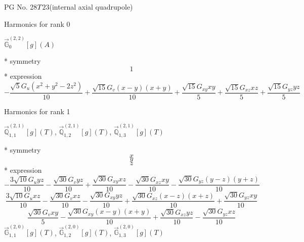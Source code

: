 \documentclass[fleqn,8pt]{jsarticle}
\begin{document}
\setcounter{MaxMatrixCols}{32}

\renewcommand{\tablename}{Table~}
\renewcommand{\figurename}{Figure~}
\begin{center}
\LARGE
PG No. 28\quad$T_{\rm }$\quad$23$\quad[ cubic ] (internal axial quadrupole)
\end{center}

\noindent * Harmonics for rank 0

\noindent\quad $\vec{\mathbb{G}}_{0}^{(2,2)}[g](A)$

\noindent\quad ** symmetry
\begin{dmath*}
1
\end{dmath*}
\noindent\quad ** expression
\begin{dmath*}
- \frac{\sqrt{5} G_{u} \left(x^{2} + y^{2} - 2 z^{2}\right)}{10} + \frac{\sqrt{15} G_{v} \left(x - y\right) \left(x + y\right)}{10} + \frac{\sqrt{15} G_{xy} x y}{5} + \frac{\sqrt{15} G_{xz} x z}{5} + \frac{\sqrt{15} G_{yz} y z}{5}
\end{dmath*}

\noindent * Harmonics for rank 1

\noindent\quad $\vec{\mathbb{Q}}_{1,1}^{(2,1)}[g](T)$, $\vec{\mathbb{Q}}_{1,2}^{(2,1)}[g](T)$, $\vec{\mathbb{Q}}_{1,3}^{(2,1)}[g](T)$

\noindent\quad ** symmetry
\begin{dmath*}
x
\end{dmath*}
\begin{dmath*}
y
\end{dmath*}
\begin{dmath*}
z
\end{dmath*}
\noindent\quad ** expression
\begin{dmath*}
- \frac{3 \sqrt{10} G_{u} y z}{10} - \frac{\sqrt{30} G_{v} y z}{10} + \frac{\sqrt{30} G_{xy} x z}{10} - \frac{\sqrt{30} G_{xz} x y}{10} - \frac{\sqrt{30} G_{yz} \left(y - z\right) \left(y + z\right)}{10}
\end{dmath*}
\begin{dmath*}
\frac{3 \sqrt{10} G_{u} x z}{10} - \frac{\sqrt{30} G_{v} x z}{10} - \frac{\sqrt{30} G_{xy} y z}{10} + \frac{\sqrt{30} G_{xz} \left(x - z\right) \left(x + z\right)}{10} + \frac{\sqrt{30} G_{yz} x y}{10}
\end{dmath*}
\begin{dmath*}
\frac{\sqrt{30} G_{v} x y}{5} - \frac{\sqrt{30} G_{xy} \left(x - y\right) \left(x + y\right)}{10} + \frac{\sqrt{30} G_{xz} y z}{10} - \frac{\sqrt{30} G_{yz} x z}{10}
\end{dmath*}
\noindent\quad $\vec{\mathbb{G}}_{1,1}^{(2,0)}[g](T)$, $\vec{\mathbb{G}}_{1,2}^{(2,0)}[g](T)$, $\vec{\mathbb{G}}_{1,3}^{(2,0)}[g](T)$
\end{document}

